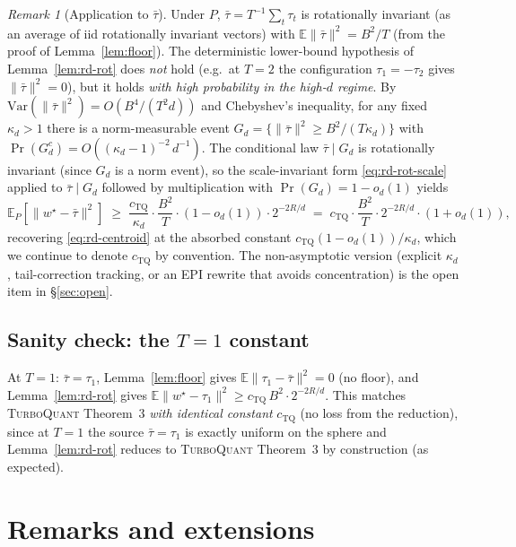 \documentclass{article}
\theoremstyle{remark}
\newtheorem{remark}[theorem]{Remark}
\newcommand{\E}{\mathbb{E}}
\begin{document}
\begin{remark}[Application to $\bar\tau$]\label{rem:apply}
Under $P$, $\bar\tau = T^{-1}\sum_t \tau_t$ is rotationally invariant
(as an average of iid rotationally invariant vectors) with
$\E\|\bar\tau\|^2 = B^2/T$ (from the proof of
Lemma~\ref{lem:floor}). The deterministic lower-bound hypothesis of
Lemma~\ref{lem:rd-rot} does \emph{not} hold (e.g.\ at $T=2$ the
configuration $\tau_1 = -\tau_2$ gives $\|\bar\tau\|^2 = 0$), but
it holds \emph{with high probability in the high-$d$ regime}. By
$\mathrm{Var}(\|\bar\tau\|^2) = O(B^4/(T^2 d))$ and Chebyshev's
inequality, for any fixed $\kappa_d > 1$ there is a norm-measurable
event $G_d = \{\|\bar\tau\|^2 \geq B^2/(T\kappa_d)\}$ with
$\Pr(G_d^c) = O((\kappa_d-1)^{-2}\,d^{-1})$. The conditional law
$\bar\tau \mid G_d$ is rotationally invariant (since $G_d$ is a
norm event), so the scale-invariant form \eqref{eq:rd-rot-scale}
applied to $\bar\tau \mid G_d$ followed by multiplication with
$\Pr(G_d) = 1 - o_d(1)$ yields
\[
  \E_P\!\left[\|w^\star - \bar\tau\|^2\right]
  \;\geq\; \frac{c_{\mathrm{TQ}}}{\kappa_d}\cdot\frac{B^2}{T}
  \cdot (1 - o_d(1)) \cdot 2^{-2R/d}
  \;=\; c_{\mathrm{TQ}}\cdot\frac{B^2}{T}\cdot 2^{-2R/d}
  \cdot (1 + o_d(1)),
\]
recovering \eqref{eq:rd-centroid} at the absorbed constant
$c_{\mathrm{TQ}}(1-o_d(1))/\kappa_d$, which we continue to denote
$c_{\mathrm{TQ}}$ by convention. The non-asymptotic version
(explicit $\kappa_d$, tail-correction tracking, or an EPI rewrite
that avoids concentration) is the open item in
\S\ref{sec:open}.
\end{remark}

\subsection*{Sanity check: the $T = 1$ constant}

At $T = 1$: $\bar\tau = \tau_1$, Lemma~\ref{lem:floor} gives
$\E\|\tau_1 - \bar\tau\|^2 = 0$ (no floor), and
Lemma~\ref{lem:rd-rot} gives $\E\|w^\star - \tau_1\|^2 \geq
c_{\mathrm{TQ}}\,B^2\cdot 2^{-2R/d}$. This matches \textsc{TurboQuant}
Theorem~3 \emph{with identical constant} $c_{\mathrm{TQ}}$ (no loss
from the reduction), since
at $T=1$ the source $\bar\tau = \tau_1$ is exactly uniform on the
sphere and Lemma~\ref{lem:rd-rot} reduces to \textsc{TurboQuant}
Theorem~3 by construction (as expected).

\section{Remarks and extensions}
\end{document}
